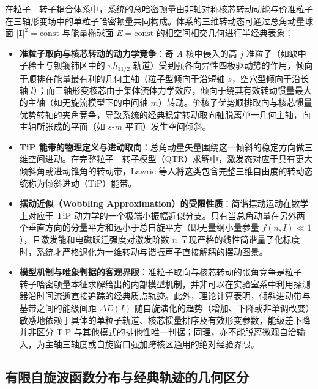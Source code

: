 在粒子—转子耦合体系中，系统的总哈密顿量由非轴对称核芯转动动能与价准粒子在三轴形变场中的单粒子哈密顿量共同构成。体系的三维转动态可通过总角动量球面 $|\mathbf{I}|^2 = \text{const}$ 与能量椭球面 $E = \text{const}$ 的相空间相交几何进行半经典表象：
\begin{itemize}
\item \textbf{准粒子取向与核芯转动的动力学竞争}：奇 $A$ 核中侵入的高 $j$ 准粒子（如缺中子稀土与钡镧铈区中的 $\pi h_{11/2}$ 轨道）受到强各向异性四极驱动势的作用，倾向于顺排在能量最有利的几何主轴（粒子型倾向于沿短轴 $s$，空穴型倾向于沿长轴 $l$）；而三轴形变核芯由于集体流体力学效应，倾向于绕其有效转动惯量最大的主轴（如无旋流模型下的中间轴 $m$）转动。价核子优势顺排取向与核芯惯量优势转轴的夹角竞争，导致系统的经典稳定转动取向轴脱离单一几何主轴，向主轴所张成的平面（如 $s$-$m$ 平面）发生空间倾斜。
\item \textbf{TiP 能带的物理定义与进动取向}：总角动量矢量围绕这一倾斜的稳定方向做三维空间进动。在完整粒子—转子模型（QTR）求解中，激发态对应于具有更大倾斜角或进动锥角的转动带，Lawrie 等人将这类包含完整三维自由度的转动态统称为倾斜进动（TiP）能带。
\item \textbf{摆动近似（Wobbling Approximation）的受限性质}：简谐摆动运动在数学上对应于 TiP 动力学的一个极端小振幅近似分支。只有当总角动量在另外两个垂直方向的分量平方和远小于总自旋平方（即无量纲小量参量 $f(n, I) \ll 1$），且激发能和电磁跃迁强度对激发阶数 $n$ 呈现严格的线性简谐量子化标度时，系统才严格退化为一维转动与谐振声子直接解耦的摆动图景。
\item \textbf{模型机制与唯象判据的客观界限}：准粒子取向与核芯转动的张角竞争是粒子—转子哈密顿量本征求解给出的内部模型机制，并非可以在实验室系中利用探测器沿时间流逝直接追踪的经典质点轨迹。此外，理论计算表明，倾斜进动带与基带之间的能级间距 $\Delta E(I)$ 随自旋演化的趋势（增加、下降或非单调改变）敏感地依赖于具体的单粒子轨道、核芯惯量排序及有效形变参数，能级差下降并非区分 TiP 与其他模式的排他性唯一判据；同理，亦不能脱离微观自洽输入，为主轴三轴度或自旋窗口强加跨核区通用的绝对经验界限。
\end{itemize}

\subsection{有限自旋波函数分布与经典轨迹的几何区分}\label{sec:3-4-3}

